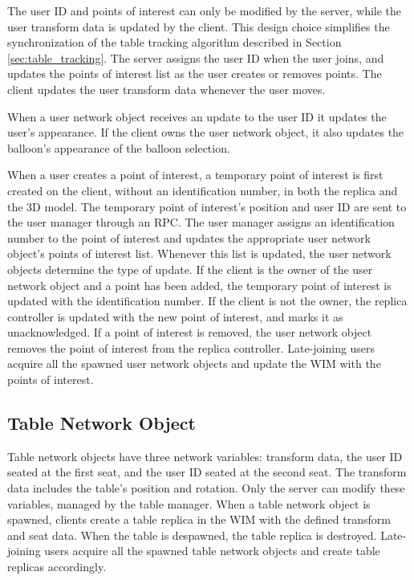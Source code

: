         The user ID and points of interest can only be modified by the server, while the user transform data is updated by the client. This design choice simplifies the synchronization of the table tracking algorithm described in Section \ref{sec:table_tracking}. The server assigns the user ID when the user joins, and updates the points of interest list as the user creates or removes points. The client updates the user transform data whenever the user moves.
        
        When a user network object receives an update to the user ID it updates the user's appearance. If the client owns the user network object, it also updates the balloon's appearance of the balloon selection.

        When a user creates a point of interest, a temporary point of interest is first created on the client, without an identification number, in both the replica and the 3D model. The temporary point of interest's position and user ID are sent to the user manager through an RPC. The user manager assigns an identification number to the point of interest and updates the appropriate user network object's points of interest list. Whenever this list is updated, the user network objects determine the type of update. If the client is the owner of the user network object and a point has been added, the temporary point of interest is updated with the identification number. If the client is not the owner, the replica controller is updated with the new point of interest, and marks it as unacknowledged. If a point of interest is removed, the user network object removes the point of interest from the replica controller. Late-joining users acquire all the spawned user network objects and update the WIM with the points of interest. 

    \subsection{Table Network Object} \label{sec:table_network}

        Table network objects have three network variables: transform data, the user ID seated at the first seat, and the user ID seated at the second seat. The transform data includes the table's position and rotation. Only the server can modify these variables, managed by the table manager. When a table network object is spawned, clients create a table replica in the WIM with the defined transform and seat data. When the table is despawned, the table replica is destroyed. Late-joining users acquire all the spawned table network objects and create table replicas accordingly.

